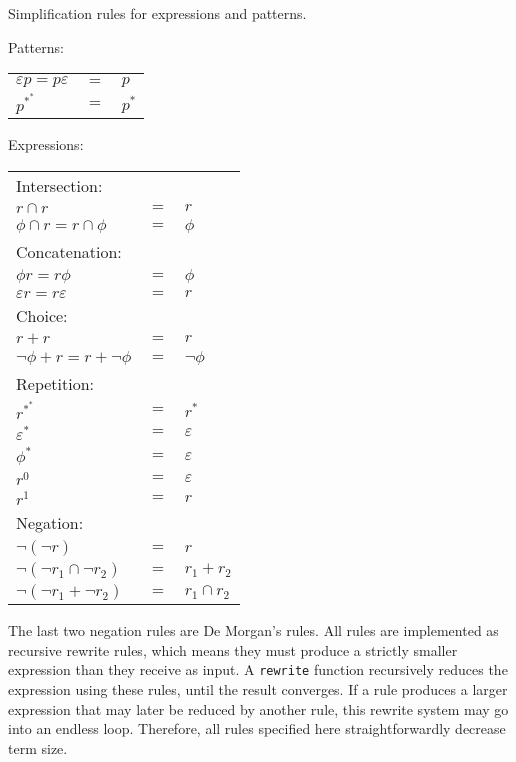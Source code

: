 \begin{defn}
   \label{defn-simplify}
   Simplification rules for expressions and patterns.

   Patterns:

   \begin{tabular}{lrl}
      $\varepsilon p = p \varepsilon$	& $=$	& $p$				\\
      $p^{*^*}$				& $=$	& $p^*$				\\
   \end{tabular}

   Expressions:

   \begin{tabular}{lrl}
      Intersection:								\\
      $r \cap r$			& $=$	& $r$				\\
      $\phi \cap r = r \cap \phi$	& $=$	& $\phi$			\\
      Concatenation:								\\
      $\phi r = r \phi$			& $=$	& $\phi$			\\
      $\varepsilon r = r \varepsilon$	& $=$	& $r$				\\
      Choice:									\\
      $r + r$				& $=$	& $r$				\\
      $\neg\phi + r = r + \neg\phi$	& $=$	& $\neg\phi$			\\
      Repetition:								\\
      $r^{*^*}$				& $=$	& $r^*$				\\
      $\varepsilon^*$			& $=$	& $\varepsilon$			\\
      $\phi^*$				& $=$	& $\varepsilon$			\\
      $r^0$				& $=$	& $\varepsilon$			\\
      $r^1$				& $=$	& $r$				\\
      Negation:									\\
      $\neg(\neg r)$			& $=$	& $r$				\\
      $\neg(\neg r_1 \cap \neg r_2)$	& $=$	& $r_1 + r_2$			\\
      $\neg(\neg r_1 + \neg r_2)$	& $=$	& $r_1 \cap r_2$		\\
   \end{tabular}
\end{defn}

The last two negation rules are De Morgan's rules. All rules are implemented as
recursive rewrite rules, which means they must produce a strictly smaller
expression than they receive as input. A \texttt{rewrite} function recursively
reduces the expression using these rules, until the result converges. If a rule
produces a larger expression that may later be reduced by another rule, this
rewrite system may go into an endless loop. Therefore, all rules specified here
straightforwardly decrease term size.

